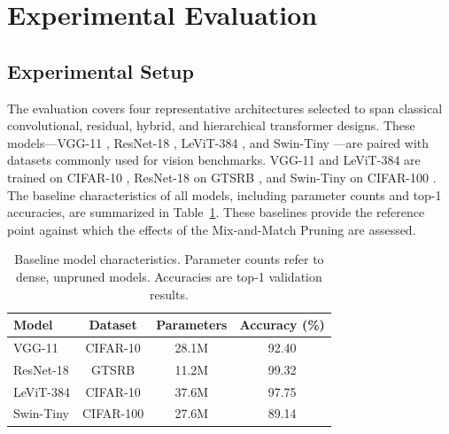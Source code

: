 \documentclass[11pt, conference]{IEEEtran}
\begin{document}

\FloatBarrier
\section{Experimental Evaluation}
\label{sec:results}
\subsection{Experimental Setup}

The evaluation covers four representative architectures selected to span classical convolutional, residual, hybrid, and hierarchical transformer designs. These models—VGG-11 \cite{simonyan2015vgg}, ResNet-18 \cite{he2016resnet}, LeViT-384 \cite{graham2021levit}, and Swin-Tiny \cite{liu2021swin}—are paired with datasets commonly used for vision benchmarks. VGG-11 and LeViT-384 are trained on CIFAR-10 \cite{krizhevsky2009cifar}, ResNet-18 on GTSRB \cite{stallkamp2012gtsrb}, and Swin-Tiny on CIFAR-100 \cite{krizhevsky2009cifar}. The baseline characteristics of all models, including parameter counts and top-1 accuracies, are summarized in Table~\ref{tab:baselines}. These baselines provide the reference point against which the effects of the Mix-and-Match Pruning are assessed.

\begin{table}[!ht]
\centering
\caption{Baseline model characteristics. Parameter counts refer to dense, unpruned models. Accuracies are top-1 validation results.}
\label{tab:baselines}
\begin{tabular}{lccc}
\toprule
Model & Dataset & Parameters & Accuracy (\%) \\
\midrule
VGG-11 & CIFAR-10 & 28.1M & 92.40 \\
ResNet-18 & GTSRB & 11.2M & 99.32 \\
LeViT-384 & CIFAR-10 & 37.6M & 97.75 \\
Swin-Tiny & CIFAR-100 & 27.6M & 89.14 \\
\bottomrule
\end{tabular}
\end{table}
\end{document}
